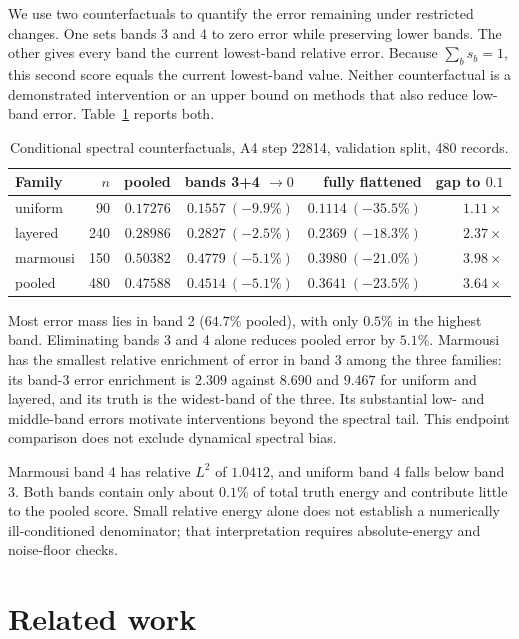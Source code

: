 \documentclass[11pt,a4paper]{article}
\begin{document}
We use two counterfactuals to quantify the error remaining under restricted changes. One
sets bands 3 and 4 to zero error while preserving lower bands. The other gives every band
the current lowest-band relative error. Because $\sum_b s_b=1$, this second score equals
the current lowest-band value. Neither counterfactual is a demonstrated intervention or an
upper bound on methods that also reduce low-band error. Table~\ref{tab:ceil} reports both.

\begin{table}[t]
\centering
\caption{Conditional spectral counterfactuals, A4 step 22814, validation split, 480 records.}
\label{tab:ceil}
\begin{tabular}{lrrrrr}
\toprule
Family & $n$ & pooled & bands 3+4 $\to 0$ & fully flattened & gap to $0.1$ \\
\midrule
uniform  & 90  & $0.17276$ & $0.1557\ (-9.9\%)$ & $0.1114\ (-35.5\%)$ & $1.11\times$ \\
layered  & 240 & $0.28986$ & $0.2827\ (-2.5\%)$ & $0.2369\ (-18.3\%)$ & $2.37\times$ \\
marmousi & 150 & $0.50382$ & $0.4779\ (-5.1\%)$ & $0.3980\ (-21.0\%)$ & $\mathbf{3.98\times}$ \\
pooled   & 480 & $0.47588$ & $0.4514\ (-5.1\%)$ & $0.3641\ (-23.5\%)$ & $3.64\times$ \\
\bottomrule
\end{tabular}
\end{table}

Most error mass lies in band 2 ($64.7\%$ pooled), with only $0.5\%$ in the highest band.
Eliminating bands 3 and 4 alone reduces pooled error by $5.1\%$. Marmousi has the smallest
relative enrichment of error in band 3 among the three families: its
band-3 error enrichment is $2.309$ against $8.690$ and $9.467$ for uniform and layered, and
its truth is the widest-band of the three. Its substantial low- and middle-band errors motivate interventions beyond the spectral tail.
This endpoint comparison does not exclude dynamical spectral bias.

Marmousi band 4 has relative $L^2$ of $1.0412$, and uniform band 4 falls below band 3.
Both bands contain only about $0.1\%$ of total truth energy and contribute little to the
pooled score. Small relative energy alone does not establish a numerically ill-conditioned
denominator; that interpretation requires absolute-energy and noise-floor checks.

\section{Related work}
\end{document}
